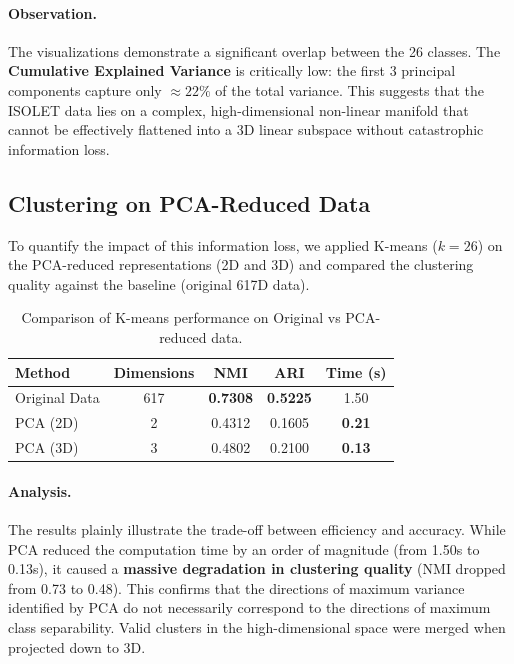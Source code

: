 \documentclass[12pt]{article}
\begin{document}
\paragraph{Observation.} The visualizations demonstrate a significant overlap between the 26 classes. The \textbf{Cumulative Explained Variance} is critically low: the first 3 principal components capture only $\approx 22\%$ of the total variance. This suggests that the ISOLET data lies on a complex, high-dimensional non-linear manifold that cannot be effectively flattened into a 3D linear subspace without catastrophic information loss.

\subsection{Clustering on PCA-Reduced Data}
To quantify the impact of this information loss, we applied K-means ($k=26$) on the PCA-reduced representations (2D and 3D) and compared the clustering quality against the baseline (original 617D data).

\begin{table}[H]
\centering
\begin{tabular}{lcccc}
\toprule
\textbf{Method} & \textbf{Dimensions} & \textbf{NMI} & \textbf{ARI} & \textbf{Time (s)} \\
\midrule
Original Data & 617 & \textbf{0.7308} & \textbf{0.5225} & 1.50 \\
PCA (2D) & 2 & 0.4312 & 0.1605 & \textbf{0.21} \\
PCA (3D) & 3 & 0.4802 & 0.2100 & \textbf{0.13} \\
\bottomrule
\end{tabular}
\caption{Comparison of K-means performance on Original vs PCA-reduced data.}
\label{tab:pca_results}
\end{table}

\paragraph{Analysis.} The results plainly illustrate the trade-off between efficiency and accuracy. While PCA reduced the computation time by an order of magnitude (from 1.50s to 0.13s), it caused a \textbf{massive degradation in clustering quality} (NMI dropped from 0.73 to 0.48). This confirms that the directions of maximum variance identified by PCA do not necessarily correspond to the directions of maximum class separability. Valid clusters in the high-dimensional space were merged when projected down to 3D.
\end{document}
